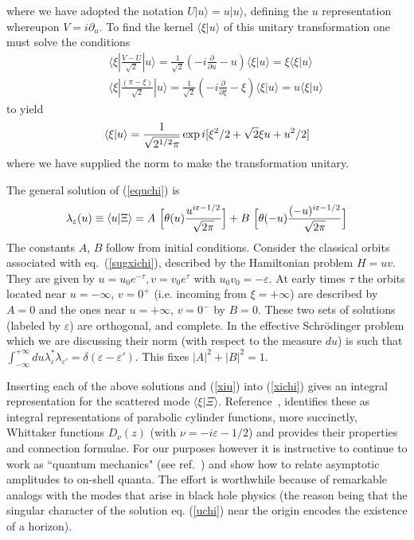 \documentclass[12pt,oneside]{report}
\def\braket#1#2{\mathrel{\langle #1|#2\rangle}}
\begin{document}
where we have adopted the notation $U|u\rangle = u|u\rangle$, defining  
the $u$ representation whereupon
$V=i\partial _u$.  To find the kernel $\braket{\xi}{u}$ of
this unitary transformation  one must solve the conditions
\begin{eqnarray*}
&& \langle \xi \left| \frac{V-U}{\sqrt 2} \right| u \rangle =
\frac{1}{\sqrt 2}\left(-i \frac{\partial}{\partial u} - u \right)
\langle \xi | u \rangle = \xi \langle \xi | u \rangle       \\
&& \langle \xi \left| \frac{(\pi - \xi)}{\sqrt 2} \right| u
\rangle = \frac{1}{\sqrt 2} \left(- i \frac{\partial}{\partial \xi}
- \xi \right) \langle \xi |u \rangle = u \langle \xi | u \rangle
\end{eqnarray*}
to yield
\begin{equation}
\langle \xi | u \rangle  = {1\over \sqrt{2^{1/2}\pi}} \exp i [\xi^2/2+\sqrt{2}\xi u+u^2/2 ]
\label{xiu}
\end{equation}
where we have supplied the norm to make the transformation unitary.
\par\noindent The general solution of (\ref{equchi}) is
\begin{equation}
\lambda_{\varepsilon}(u)\equiv \langle u |  \Xi  \rangle  = 
A \ \Bigl[ \theta(u) { u^{i \varepsilon - 1/2}\over
\sqrt{2\pi}} \Bigr]
+ B \ \Bigl[ \theta(-u) {(-u)^{i \varepsilon - 1/2} \over
\sqrt{2\pi}} \Bigr]
\label{uchi}
\end{equation}
The constants $A$, $B$ follow from initial conditions. Consider the classical orbits
associated with eq.~(\ref{sugxichi}), described by the Hamiltonian problem 
$H= u v 
$. They are given by $ u=u_0 e^{-\tau} , v=v_0 e^{\tau}$ with $u_0v_0=-
\varepsilon$.
 At early times $\tau$ the orbits located near
$u=-\infty$, $v=0^+$ 
(i.e. incoming from $\xi = +
\infty$) are described by $A=0$ and the ones near $u=+\infty$, $v=0^-$ 
by $B=0$. These two sets of solutions
(labeled by $\varepsilon $) are orthogonal, and complete. In the effective
Schr\"odinger problem
 which we are discussing their norm (with respect to the measure $du$) is
such that $\int^{+\infty}_{-\infty} du \lambda_{\varepsilon}^{*} 
\lambda_{\varepsilon'}
=\delta(\varepsilon - \varepsilon')$. This fixes $|A|^2 +|B|^2=1$.
\par Inserting each of the 
above solutions and (\ref{xiu}) into (\ref{xichi}) gives
an integral representation for the scattered mode $\langle \xi |  \Xi  \rangle$.
Reference~\cite{WiWa}, identifies these as integral representations of  parabolic
cylinder functions, more succinctly, Whittaker functions $D_{\nu}(z)$ 
(with $\nu = - i \varepsilon -1/2$) and provides 
their properties and
connection formulae. For our purposes however
it is instructive to continue to work as ``quantum mechanics" 
(see ref.~\cite{PaBr0}) and show how to relate asymptotic
amplitudes to on-shell quanta. 
The effort is worthwhile because of remarkable analogs with the modes
that arise in black hole physics  (the reason being that the 
singular character of
the solution eq.
(\ref{uchi}) near the origin encodes the existence of a horizon). 
\end{document}
